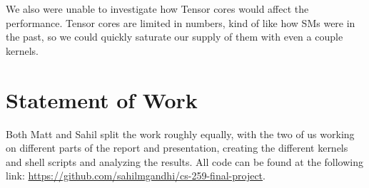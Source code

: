 \documentclass[sigconf]{acmart}
\begin{document}
We also were unable to investigate how Tensor cores would affect the performance. Tensor cores are limited in numbers, kind of like how SMs were in the past, so we could quickly saturate our supply of them with even a couple kernels. 

\section{Statement of Work}
Both Matt and Sahil split the work roughly equally, with the two of us working on different parts of the report and presentation, creating the different kernels and shell scripts and analyzing the results. All code can be found at the following link: \url{https://github.com/sahilmgandhi/cs-259-final-project}.








\end{document}
